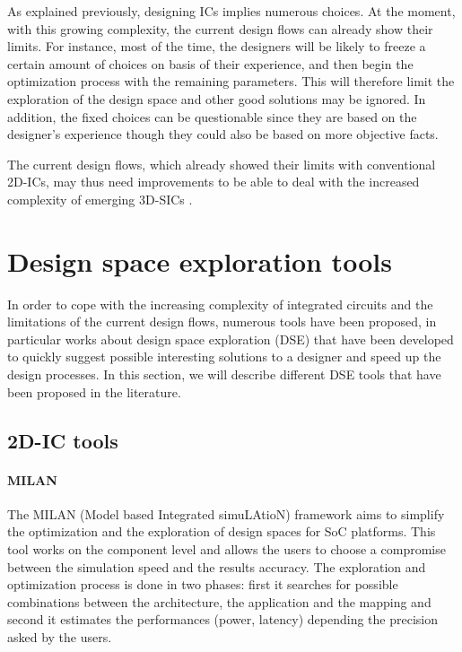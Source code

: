 As explained previously, designing ICs implies numerous choices. At the moment, with this growing complexity, the current design flows can already show their limits. For instance, most of the time, the designers will be likely to freeze a certain amount of choices on basis of their experience, and then begin the optimization process with the remaining parameters. This will therefore limit the exploration of the design space and other good solutions may be ignored. In addition, the fixed choices can be questionable since they are based on the designer's experience though they could also be based on more objective facts.

The current design flows, which already showed their limits with conventional 2D-ICs, may thus need improvements to be able to deal with the increased complexity of emerging 3D-SICs \cite{vanderbiest06, PFF10}.

\section{Design space exploration tools}

In order to cope with the increasing complexity of integrated circuits and the limitations of the current design flows, numerous tools have been proposed, in particular works about design space exploration (DSE) that have been developed to quickly suggest possible interesting solutions to a designer and speed up the design processes. In this section, we will describe different DSE tools that have been proposed in the literature.

\subsection{2D-IC tools}

\paragraph{MILAN}

The MILAN (Model based Integrated simuLAtioN) framework \cite{Mohanty02rapidsystem-level} aims to simplify the optimization and the exploration of design spaces for SoC platforms. This tool works on the component level and allows the users to choose a compromise between the simulation speed and the results accuracy. The exploration and optimization process is done in two phases: first it searches for possible combinations between the architecture, the application and the mapping and second it estimates the performances (power, latency) depending the precision asked by the users.

